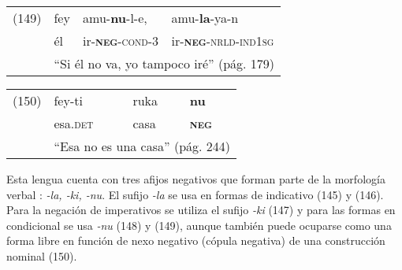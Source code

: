{%
\begin{tabular}{llll}
(149) & fey & amu-\textbf{nu}-l-e, & amu-\textbf{la}-ya-n \\
& él & ir-\textsc{\textbf{neg}-cond-3} & ir-\textsc{\textbf{neg}-nrld-ind1sg} \\
& \multicolumn{3}{l}{``Si él no va, yo tampoco iré'' (pág. 179)}
\end{tabular} \vspace{0.5cm}

\begin{tabular}{llll}
(150) & fey-ti & ruka & \textbf{nu} \\
& esa.\textsc{det} & casa & \textsc{\textbf{neg}} \\
& \multicolumn{3}{l}{``Esa no es una casa'' (pág. 244)}
\end{tabular} \vspace{0.5cm}

}

Esta lengua cuenta con tres afijos negativos que forman parte de la morfología verbal \textcolor{MidnightBlue}{\citep{mapuche}}: {\setmainfont{Charis SIL} \textit{-la, -ki, -nu}}. El sufijo {\setmainfont{Charis SIL} \textit{-la}} se usa en formas de indicativo (145) y (146). Para la negación de imperativos se utiliza el sufijo {\setmainfont{Charis SIL} \textit{-ki}} (147) y para las formas en condicional se usa {\setmainfont{Charis SIL} \textit{-nu}} (148) y (149), aunque también puede ocuparse como una forma libre en función de nexo negativo (cópula negativa) de una construcción nominal (150).